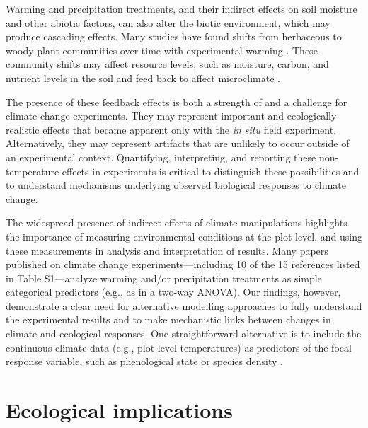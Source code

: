 \documentclass{article}
\begin{document}
\par Warming and precipitation treatments, and their indirect effects on soil moisture and other abiotic factors, can also alter the biotic environment, which may produce cascading effects. Many studies have found shifts from herbaceous to woody plant communities over time with experimental warming \citep[e.g.,][]{rollinson2012, mcdaniel2014,mcdaniel2014b, harte2015}. These community shifts may affect resource levels, such as moisture, carbon, and nutrient levels in the soil \citep{mcdaniel2014,mcdaniel2014b, harte2015} and feed back to affect microclimate \citep{harte2015}. 
\par The presence of these feedback effects is both a strength of and a challenge for climate change experiments. They may represent important and ecologically realistic effects that became apparent only with the \emph{in situ} field experiment. Alternatively, they may represent artifacts that are unlikely to occur outside of an experimental context. Quantifying, interpreting, and reporting these non-temperature effects in experiments is critical to distinguish these possibilities and to understand mechanisms underlying observed biological responses to climate change. 

\par The widespread presence of indirect effects of climate manipulations highlights the importance of measuring environmental conditions at the plot-level, and using these measurements in analysis and interpretation of results. Many papers published on climate change experiments---including 10 of the 15 references listed in Table S1---analyze warming and/or precipitation treatments as simple categorical predictors (e.g., as in a two-way ANOVA). Our findings, however, demonstrate a clear need for alternative modelling approaches to fully understand the experimental results and to make mechanistic links between changes in climate and ecological responses. One straightforward alternative is to include the continuous climate data (e.g., plot-level temperatures) as predictors of the focal response variable, such as phenological state or species density \citep [e.g.,][]{marchin2015, pelini2014}.

\section* {Ecological implications}
\end{document}
